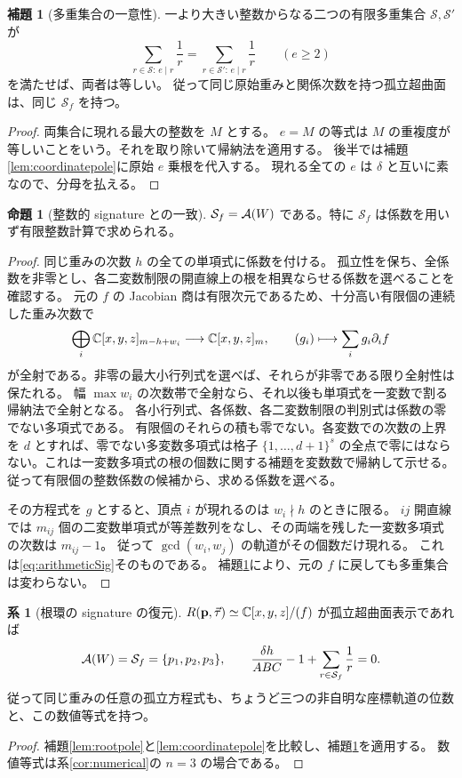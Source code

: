 \documentclass[11pt,a4paper]{ltjsarticle}
\numberwithin{equation}{section}
\theoremstyle{definition}
\newtheorem{proposition}[theorem]{命題}
\newtheorem{lemma}[theorem]{補題}
\newtheorem{corollary}[theorem]{系}
\newcommand{\bp}{\mathbf p}\newcommand{\bw}{\mathbf w}\newcommand{\one}{\mathbf 1}
\begin{document}
\begin{lemma}[多重集合の一意性]\label{lem:recovermultiset}
一より大きい整数からなる二つの有限多重集合 $\mathcal S,\mathcal S'$ が
\[
 \sum_{r\in\mathcal S:\,e\mid r}\frac1r
 =\sum_{r\in\mathcal S':\,e\mid r}\frac1r\qquad(e\ge2)
\]
を満たせば、両者は等しい。
従って同じ原始重みと関係次数を持つ孤立超曲面は、同じ $\mathcal S_f$ を持つ。
\end{lemma}
\begin{proof}
両集合に現れる最大の整数を $M$ とする。
$e=M$ の等式は $M$ の重複度が等しいことをいう。それを取り除いて帰納法を適用する。
後半では補題\ref{lem:coordinatepole}に原始 $e$ 乗根を代入する。
現れる全ての $e$ は $\delta$ と互いに素なので、分母を払える。
\end{proof}

\begin{proposition}[整数的 signature との一致]\label{prop:arithsignature}
$\mathcal S_f=\mathcal A(W)$ である。特に $\mathcal S_f$ は係数を用いず有限整数計算で求められる。
\end{proposition}
\begin{proof}
同じ重みの次数 $h$ の全ての単項式に係数を付ける。
孤立性を保ち、全係数を非零とし、各二変数制限の開直線上の根を相異ならせる係数を選べることを確認する。
元の $f$ の Jacobian 商は有限次元であるため、十分高い有限個の連続した重み次数で
\[
 \bigoplus_i\mathbb C[x,y,z]_{m-h+w_i}\longrightarrow\mathbb C[x,y,z]_m,
 \qquad(g_i)\longmapsto\sum_i g_i\partial_i f
\]
が全射である。非零の最大小行列式を選べば、それらが非零である限り全射性は保たれる。
幅 $\max w_i$ の次数帯で全射なら、それ以後も単項式を一変数で割る帰納法で全射となる。
各小行列式、各係数、各二変数制限の判別式は係数の零でない多項式である。
有限個のそれらの積も零でない。各変数での次数の上界を $d$ とすれば、零でない多変数多項式は格子 $\{1,\dots,d+1\}^s$ の全点で零にはならない。これは一変数多項式の根の個数に関する補題を変数数で帰納して示せる。従って有限個の整数係数の候補から、求める係数を選べる。

その方程式を $g$ とすると、頂点 $i$ が現れるのは $w_i\nmid h$ のときに限る。
$ij$ 開直線では $m_{ij}$ 個の二変数単項式が等差数列をなし、その両端を残した一変数多項式の次数は $m_{ij}-1$。
従って $\gcd(w_i,w_j)$ の軌道がその個数だけ現れる。
これは\eqref{eq:arithmeticSig}そのものである。
補題\ref{lem:recovermultiset}により、元の $f$ に戻しても多重集合は変わらない。
\end{proof}

\begin{corollary}[根環の signature の復元]\label{cor:recover}
$R(\bp,\ta)\simeq\C[x,y,z]/(f)$ が孤立超曲面表示であれば
\begin{equation}\label{eq:recover}
 \mathcal A(W)=\mathcal S_f=\{p_1,p_2,p_3\},\qquad
 \frac{\delta h}{ABC}-1+\sum_{r\in\mathcal S_f}\frac1r=0.
\end{equation}
従って同じ重みの任意の孤立方程式も、ちょうど三つの非自明な座標軌道の位数と、この数値等式を持つ。
\end{corollary}
\begin{proof}
補題\ref{lem:rootpole}と\ref{lem:coordinatepole}を比較し、補題\ref{lem:recovermultiset}を適用する。
数値等式は系\ref{cor:numerical}の $n=3$ の場合である。
\end{proof}
\end{document}
